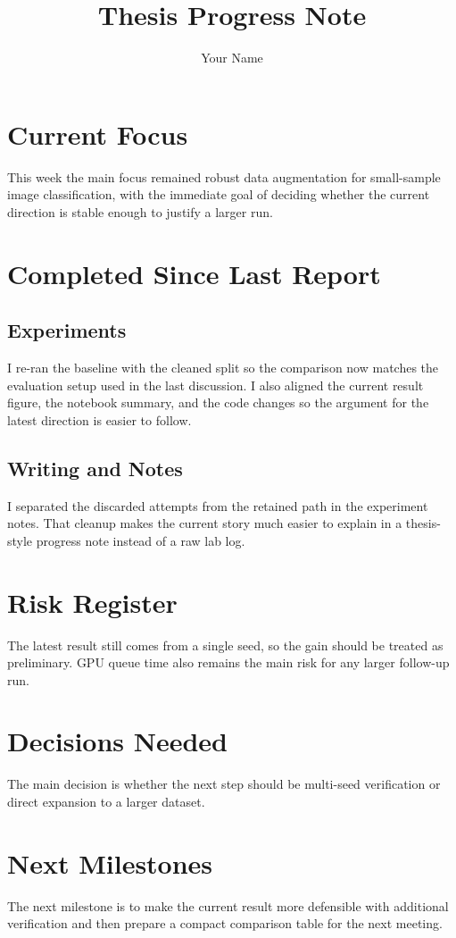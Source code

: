 \documentclass[11pt,a4paper]{report}
\title{Thesis Progress Note}
\author{Your Name}
\date{}
\begin{document}
\maketitle

\chapter*{Current Focus}
This week the main focus remained robust data augmentation for small-sample image classification, with the immediate goal of deciding whether the current direction is stable enough to justify a larger run.

\chapter*{Completed Since Last Report}

\section*{Experiments}
I re-ran the baseline with the cleaned split so the comparison now matches the evaluation setup used in the last discussion. I also aligned the current result figure, the notebook summary, and the code changes so the argument for the latest direction is easier to follow.

\section*{Writing and Notes}
I separated the discarded attempts from the retained path in the experiment notes. That cleanup makes the current story much easier to explain in a thesis-style progress note instead of a raw lab log.

\chapter*{Risk Register}
The latest result still comes from a single seed, so the gain should be treated as preliminary. GPU queue time also remains the main risk for any larger follow-up run.

\chapter*{Decisions Needed}
The main decision is whether the next step should be multi-seed verification or direct expansion to a larger dataset.

\chapter*{Next Milestones}
The next milestone is to make the current result more defensible with additional verification and then prepare a compact comparison table for the next meeting.
\end{document}
